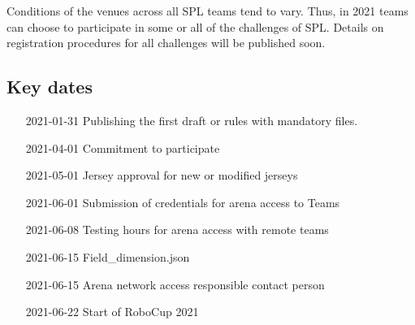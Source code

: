 Conditions of the venues across all SPL teams tend to vary. Thus, in 2021 teams can choose to participate in some or all of the challenges of SPL. Details on registration procedures for all challenges will be published soon.

\subsection{Key dates}

\begin{itemize}
    \item [2021-01-31] Publishing the first draft or rules with mandatory files.
    \item [2021-04-01] Commitment to participate
    \item [2021-05-01] Jersey approval for new or modified jerseys
    \item [2021-06-01] Submission of credentials for arena access to Teams
    \item [2021-06-08] Testing hours for arena access with remote teams
    \item [2021-06-15] Field\_dimension.json
    \item [2021-06-15] Arena network access responsible contact person
    \item [2021-06-22] Start of RoboCup 2021
\end{itemize}
